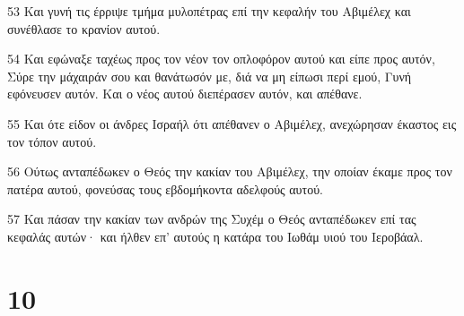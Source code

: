 \par 53 Και γυνή τις έρριψε τμήμα μυλοπέτρας επί την κεφαλήν του Αβιμέλεχ και συνέθλασε το κρανίον αυτού.
\par 54 Και εφώναξε ταχέως προς τον νέον τον οπλοφόρον αυτού και είπε προς αυτόν, Σύρε την μάχαιράν σου και θανάτωσόν με, διά να μη είπωσι περί εμού, Γυνή εφόνευσεν αυτόν. Και ο νέος αυτού διεπέρασεν αυτόν, και απέθανε.
\par 55 Και ότε είδον οι άνδρες Ισραήλ ότι απέθανεν ο Αβιμέλεχ, ανεχώρησαν έκαστος εις τον τόπον αυτού.
\par 56 Ούτως ανταπέδωκεν ο Θεός την κακίαν του Αβιμέλεχ, την οποίαν έκαμε προς τον πατέρα αυτού, φονεύσας τους εβδομήκοντα αδελφούς αυτού.
\par 57 Και πάσαν την κακίαν των ανδρών της Συχέμ ο Θεός ανταπέδωκεν επί τας κεφαλάς αυτών· και ήλθεν επ' αυτούς η κατάρα του Ιωθάμ υιού του Ιεροβάαλ.

\chapter{10}

